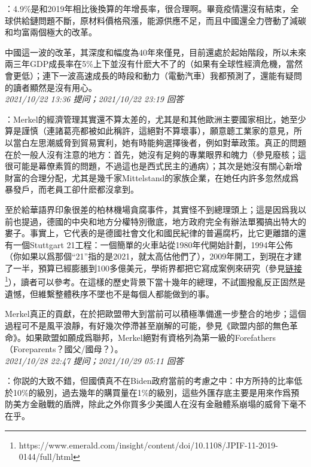 \documentclass[twocolumn]{ctexart}
\begin{document}
：4.9\%是和2019年相比後換算的年增長率，很合理啊。畢竟疫情還沒有結束，全球供給鏈問題不斷，原材料價格飛漲，能源供應不足，而且中國還全力啓動了減碳和均富兩個極大的改革。

中國這一波的改革，其深度和幅度為40年來僅見，目前還處於起始階段，所以未來兩三年GDP成長率在5\%上下並沒有什麽大不了的（如果有全球性經濟危機，當然會更低）；連下一波高速成長的時段和動力（電動汽車）我都預測了，還能有疑問的讀者顯然是沒有用心。
\\

\textit{\hfill\noindent\small 2021/10/22 13:36 提问；2021/10/22 23:19 回答}

：Merkel的經濟管理其實還不算太差的，尤其是和其他歐洲主要國家相比，她至少算是謹慎（連諸葛亮都被如此稱許，這絕對不算壞事），願意聼工業家的意見，所以當白左思潮威脅到貿易實利，她有時能夠選擇後者，例如對華政策。真正的問題在於一般人沒有注意的地方：首先，她沒有足夠的專業眼界和魄力（參見廢核；這很可能是幕僚素質的問題，不過這也是西式民主的通病）；其次是她沒有關心新增財富的合理分配，尤其是幾千家Mittelstand的家族企業，在她任内許多忽然成爲暴發戶，而老員工卻什麽都沒拿到。

至於給華語界印象很差的柏林機場貪腐事件，其實怪不到總理頭上；這是因爲我以前也提過，德國的中央和地方分權特別徹底，地方政府完全有辦法單獨搞出特大的婁子。事實上，它代表的是德國社會文化和國民紀律的普遍腐朽，比它更離譜的還有一個Stuttgart 21工程：一個簡單的火車站從1980年代開始計劃，1994年公佈（你如果以爲那個“21”指的是2021，就太高估他們了），2009年開工，到現在才建了一半，預算已經膨脹到100多億美元，學術界都把它寫成案例來研究（參見\href{https://www.emerald.com/insight/content/doi/10.1108/JPIF-11-2019-0144/full/html}{链接\footnote{\url{https://www.emerald.com/insight/content/doi/10.1108/JPIF-11-2019-0144/full/html}}}），讀者可以參考。在這樣的歷史背景下當十幾年的總理，不試圖撥亂反正固然是遺憾，但維繫整體秩序不墜也不是每個人都能做到的事。

Merkel真正的貢獻，在於把歐盟帶大到當前可以積極準備進一步整合的地步；這個過程可不是風平浪靜，有好幾次停滯甚至崩解的可能，參見《歐盟内部的無色革命》。如果歐盟如願成爲聯邦，Merkel絕對有資格列為第一級的Forefathers（Foreparents？國父/國母？）。
\\

\textit{\hfill\noindent\small 2021/10/28 22:47 提问；2021/10/29 05:11 回答}

：你説的大致不錯，但國債真不在Biden政府當前的考慮之中：中方所持的比率低於10\%的級別，過去幾年的購買量在1\%的級別，這些外匯存底主要是用來作爲預防美方金融戰的盾牌，除此之外你買多少美國人在沒有金融體系崩塌的威脅下毫不在乎。
\end{document}
